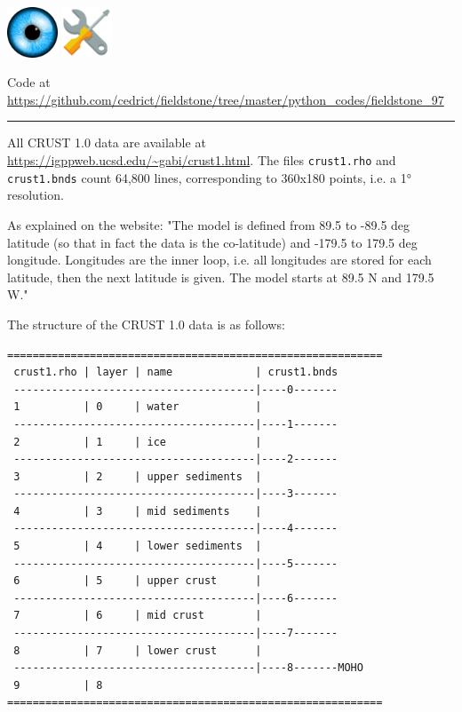 \includegraphics[height=1.5cm]{images/pictograms/visualisation}
\includegraphics[height=1.5cm]{images/pictograms/tools}




\begin{center}
Code at \url{https://github.com/cedrict/fieldstone/tree/master/python_codes/fieldstone_97}
\end{center}

\par\noindent\rule{\textwidth}{0.4pt}


All CRUST 1.0 data are available at \url{https://igppweb.ucsd.edu/~gabi/crust1.html}. 
The files {\tt crust1.rho} and {\tt crust1.bnds} count 64,800 lines,
corresponding to 360x180 points, i.e. a 1\si{\degree} resolution. 

As explained on the website: 
"The model is defined from 89.5 to -89.5 deg latitude (so that 
in fact the data is the co-latitude) and -179.5 to 179.5 deg
longitude. Longitudes are the inner loop, i.e. all longitudes are stored
for each latitude, then the next latitude is given. The model starts at 
89.5 N and 179.5 W."

The structure of the CRUST 1.0 data is as follows:

\begin{verbatim}
===========================================================
 crust1.rho | layer | name             | crust1.bnds
 --------------------------------------|----0-------
 1          | 0     | water            |
 --------------------------------------|----1-------
 2          | 1     | ice              |
 --------------------------------------|----2-------
 3          | 2     | upper sediments  |
 --------------------------------------|----3-------
 4          | 3     | mid sediments    |
 --------------------------------------|----4-------
 5          | 4     | lower sediments  | 
 --------------------------------------|----5-------
 6          | 5     | upper crust      |
 --------------------------------------|----6-------
 7          | 6     | mid crust        |
 --------------------------------------|----7-------
 8          | 7     | lower crust      |
 --------------------------------------|----8-------MOHO
 9          | 8
===========================================================
\end{verbatim}

